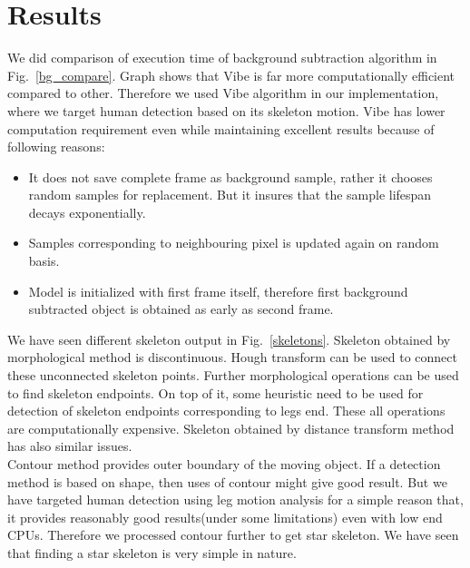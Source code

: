 \section{Results}
\indent We did comparison of execution time of background subtraction
algorithm in Fig.~\ref{bg_compare}. Graph shows that Vibe is far more
computationally efficient compared to other. Therefore we used Vibe
algorithm in our implementation, where we target human detection based
on its skeleton motion. Vibe has lower computation requirement even
while maintaining excellent results because of following reasons:
\begin{itemize}
	\item It does not save complete frame as background sample,
		rather it chooses random samples for replacement. But it
		insures that the sample lifespan decays exponentially.
	\item Samples corresponding to neighbouring pixel is updated
		again on random basis.
	\item Model is initialized with first frame itself, therefore first
		background subtracted object is obtained as early as
		second frame.
\end{itemize}
\indent We have seen different skeleton output in Fig.~\ref{skeletons}.
Skeleton obtained by morphological method is discontinuous. Hough
transform can be used to connect these unconnected skeleton points.
Further morphological operations can be used to find skeleton endpoints.
On top of it, some heuristic need to be used for detection of skeleton
endpoints corresponding to legs end. These all operations are
computationally expensive. Skeleton obtained by distance transform
method has also similar issues.\\
\indent Contour method provides outer boundary of the moving object. If
a detection method is based on shape, then uses of contour might give
good result. But we have targeted human detection using leg motion
analysis for a simple reason that, it provides reasonably good
results(under some limitations) even with low end CPUs. Therefore we
processed contour further to get star skeleton. We have seen that
finding a star skeleton is very simple in nature.

